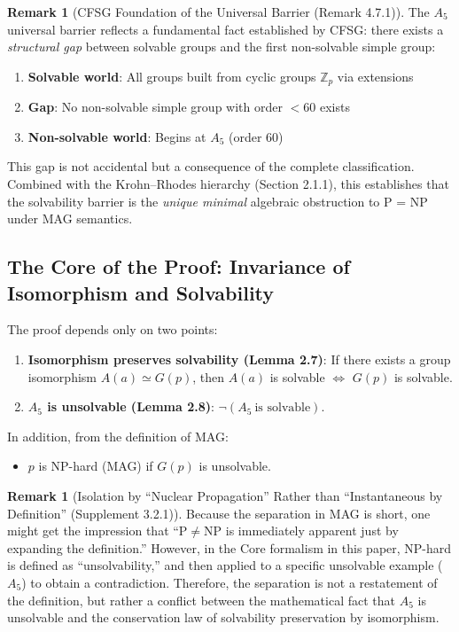 \documentclass[11pt,a4paper]{article}
\theoremstyle{plain}
\theoremstyle{definition}
\newtheorem{remark}[theorem]{Remark}
\newcommand{\Aalt}{A_5}
\begin{document}
\begin{remark}[CFSG Foundation of the Universal Barrier (Remark 4.7.1)]
The $A_5$ universal barrier reflects a fundamental fact established by CFSG: 
there exists a \emph{structural gap} between solvable groups and the first 
non-solvable simple group:
\begin{enumerate}
    \item \textbf{Solvable world}: All groups built from cyclic groups 
          $\mathbb{Z}_p$ via extensions
    \item \textbf{Gap}: No non-solvable simple group with order $< 60$ exists
    \item \textbf{Non-solvable world}: Begins at $A_5$ (order 60)
\end{enumerate}
This gap is not accidental but a consequence of the complete classification. 
Combined with the Krohn--Rhodes hierarchy (Section 2.1.1), this establishes 
that the solvability barrier is the \emph{unique minimal} algebraic obstruction 
to P = NP under MAG semantics.
\end{remark}



\subsection{The Core of the Proof: Invariance of Isomorphism and Solvability}

The proof depends only on two points:
\begin{enumerate}[nosep]
\item \textbf{Isomorphism preserves solvability (Lemma 2.7)}: If there exists a group isomorphism $A(a) \simeq G(p)$, then $A(a)$ is solvable $\Leftrightarrow$ $G(p)$ is solvable.
\item \textbf{$\Aalt$ is unsolvable (Lemma 2.8)}: $\neg(\Aalt\ \text{is solvable})$.
\end{enumerate}

In addition, from the definition of MAG:
\begin{itemize}[nosep]
\item $p$ is NP-hard (MAG) if $G(p)$ is unsolvable.
\end{itemize}

\begin{remark}[Isolation by ``Nuclear Propagation'' Rather than ``Instantaneous by Definition'' (Supplement 3.2.1)]
Because the separation in MAG is short, one might get the impression that ``$\mathrm{P} \neq \mathrm{NP}$ is immediately apparent just by expanding the definition.'' However, in the Core formalism in this paper, NP-hard is defined as ``unsolvability,'' and then applied to a specific unsolvable example ($\Aalt$) to obtain a contradiction. Therefore, the separation is not a restatement of the definition, but rather a conflict between the mathematical fact that $\Aalt$ is unsolvable and the conservation law of solvability preservation by isomorphism.
\end{remark}
\end{document}
